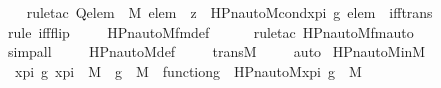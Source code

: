 \begin{isabellebody}
%
\isadelimproof
\ \ %
\endisadelimproof
%
\isatagproof
{}\isamarkupfalse%
\ {\isacharparenleft}{\kern0pt}rule{\isacharunderscore}{\kern0pt}tac\ Q{\isacharequal}{\kern0pt}{\isachardoublequoteopen}{\isasymforall}elem\ {\isasymin}\ M{\isachardot}{\kern0pt}\ elem\ {\isasymin}\ z\ {\isasymlongleftrightarrow}\ HPn{\isacharunderscore}{\kern0pt}auto{\isacharunderscore}{\kern0pt}M{\isacharunderscore}{\kern0pt}cond{\isacharparenleft}{\kern0pt}x{\isacharunderscore}{\kern0pt}pi{\isacharcomma}{\kern0pt}\ g{\isacharcomma}{\kern0pt}\ elem{\isacharparenright}{\kern0pt}{\isachardoublequoteclose}\ \ iff{\isacharunderscore}{\kern0pt}trans{\isacharparenright}{\kern0pt}\ \isanewline
\ \ \isamarkupfalse%
\ {\isacharparenleft}{\kern0pt}rule\ iff{\isacharunderscore}{\kern0pt}flip{\isacharparenright}{\kern0pt}\ \isanewline
\ \ \isamarkupfalse%
\ HPn{\isacharunderscore}{\kern0pt}auto{\isacharunderscore}{\kern0pt}M{\isacharunderscore}{\kern0pt}fm{\isacharprime}{\kern0pt}{\isacharunderscore}{\kern0pt}def\ \isanewline
\ \ \ \isamarkupfalse%
\ {\isacharparenleft}{\kern0pt}rule{\isacharunderscore}{\kern0pt}tac\ HPn{\isacharunderscore}{\kern0pt}auto{\isacharunderscore}{\kern0pt}M{\isacharunderscore}{\kern0pt}fm{\isacharprime}{\kern0pt}{\isacharunderscore}{\kern0pt}auto{\isacharparenright}{\kern0pt}\isanewline
\ \ \ \ \ \ \isamarkupfalse%
\ simp{\isacharunderscore}{\kern0pt}all\ \isanewline
\ \ \isamarkupfalse%
\ HPn{\isacharunderscore}{\kern0pt}auto{\isacharunderscore}{\kern0pt}M{\isacharunderscore}{\kern0pt}def\ \isanewline
\ \ \isamarkupfalse%
\ transM\ \isanewline
\ \ \isamarkupfalse%
\ auto%
\endisatagproof
{\isafoldproof}%
%
\isadelimproof
\isanewline
%
\endisadelimproof
\isanewline
{}\isamarkupfalse%
\ HPn{\isacharunderscore}{\kern0pt}auto{\isacharunderscore}{\kern0pt}M{\isacharunderscore}{\kern0pt}in{\isacharunderscore}{\kern0pt}M\ {\isacharcolon}{\kern0pt}\ \isanewline
\ \ {\isachardoublequoteopen}{\isasymAnd}x{\isacharunderscore}{\kern0pt}pi\ g{\isachardot}{\kern0pt}\ x{\isacharunderscore}{\kern0pt}pi\ {\isasymin}\ M\ {\isasymLongrightarrow}\ g\ {\isasymin}\ M\ {\isasymLongrightarrow}\ function{\isacharparenleft}{\kern0pt}g{\isacharparenright}{\kern0pt}\ {\isasymLongrightarrow}\ HPn{\isacharunderscore}{\kern0pt}auto{\isacharunderscore}{\kern0pt}M{\isacharparenleft}{\kern0pt}x{\isacharunderscore}{\kern0pt}pi{\isacharcomma}{\kern0pt}\ g{\isacharparenright}{\kern0pt}\ {\isasymin}\ M{\isachardoublequoteclose}\ \isanewline

\end{isabellebody}
